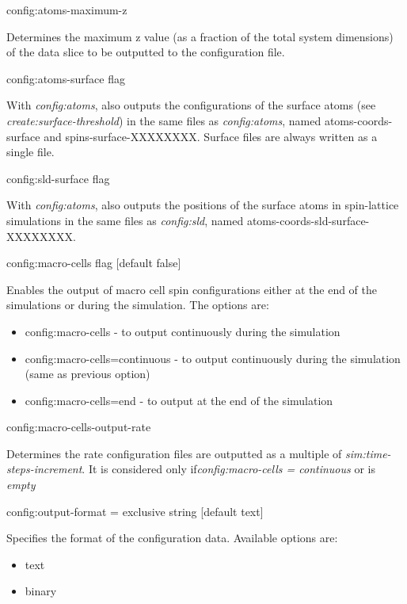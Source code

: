 {\zicf config:atoms-maximum-z} Determines the maximum z value (as a fraction of the total system dimensions) of the data slice to be outputted to the configuration file.

{\zicf config:atoms-surface flag} With \textit{config:atoms}, also outputs the configurations of the surface atoms (see \textit{create:surface-threshold}) in the same files as \textit{config:atoms}, named atoms-coords-surface and spins-surface-XXXXXXXX. Surface files are always written as a single file.

{\zicf config:sld-surface flag} With \textit{config:atoms}, also outputs the positions of the surface atoms in spin-lattice simulations in the same files as \textit{config:sld}, named atoms-coords-sld-surface-XXXXXXXX.

{\zicf config:macro-cells flag [default false]} Enables the output of macro cell spin configurations either at the end of the simulations or during the simulation. The options are:

\begin{itemize}
  \item[] config:macro-cells - to output continuously during the simulation
  \item[] config:macro-cells=continuous - to output continuously during the simulation (same as previous option)
  \item[] config:macro-cells=end - to output at the end of the simulation
\end{itemize}

{\zicf config:macro-cells-output-rate} Determines the rate configuration files are outputted as a multiple of \textit{sim:time-steps-increment}. It is considered only if\newline \textit{config:macro-cells = continuous} or is \textit{empty}

{\zicf config:output-format = exclusive string [default text]}
Specifies the format of the configuration data. Available options are:

\begin{itemize}
  \item[] text
  \item[] binary
\end{itemize}


